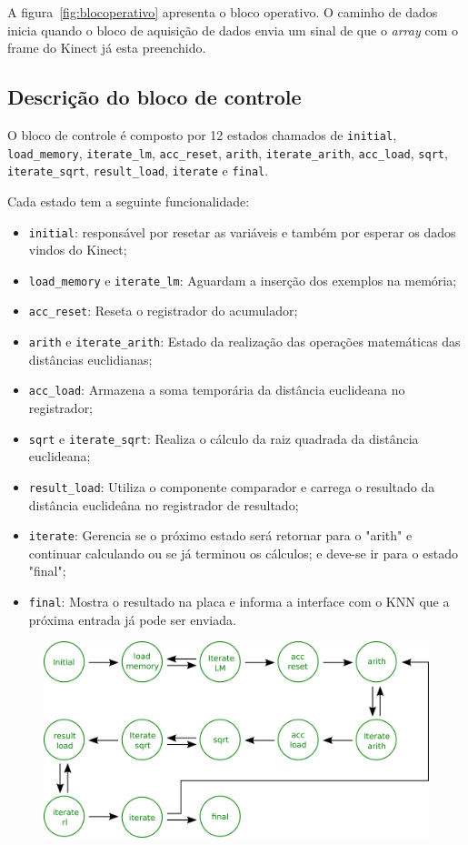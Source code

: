 \documentclass[12pt]{article}
\begin{document}
A figura~\ref{fig:blocoperativo} apresenta o bloco operativo. O caminho de
dados inicia quando o bloco de aquisição de dados envia um sinal de que o 
\textit{array} com o frame do Kinect já esta preenchido.


\subsection{Descrição do bloco de controle}

O bloco de controle é composto por 12 estados chamados de \verb|initial|,
\verb|load_memory|, \verb|iterate_lm|, \verb|acc_reset|,
\verb|arith|, \verb|iterate_arith|, \verb|acc_load|, \verb|sqrt|,
\verb|iterate_sqrt|, \verb|result_load|, \verb|iterate| e 
\verb|final|.

Cada estado tem a seguinte funcionalidade:

\begin{itemize}
\item \verb|initial|: responsável por resetar as variáveis e também por esperar os dados vindos do Kinect;
\item \verb|load_memory| e \verb|iterate_lm|: Aguardam a inserção dos exemplos na memória;
\item \verb|acc_reset|: Reseta o registrador do acumulador;
\item \verb|arith| e \verb|iterate_arith|: Estado da realização das operações matemáticas das distâncias euclidianas;
\item \verb|acc_load|: Armazena a soma temporária da distância euclideana no registrador;
\item \verb|sqrt| e \verb|iterate_sqrt|: Realiza o cálculo da raiz quadrada da distância euclideana;
\item \verb|result_load|: Utiliza o componente comparador e carrega o resultado da distância euclideâna no registrador de resultado;
\item \verb|iterate|: Gerencia se o próximo estado será retornar para o "arith" e continuar calculando ou se já terminou os cálculos;
e deve-se ir para o estado "final";
\item \verb|final|: Mostra o resultado na placa e informa a interface com o KNN que a próxima entrada já pode ser enviada.
\end{itemize}

\begin{figure}[!ht]
\centering
\includegraphics[scale=0.2]{img/control_unit.png}
\end{figure}
\end{document}
